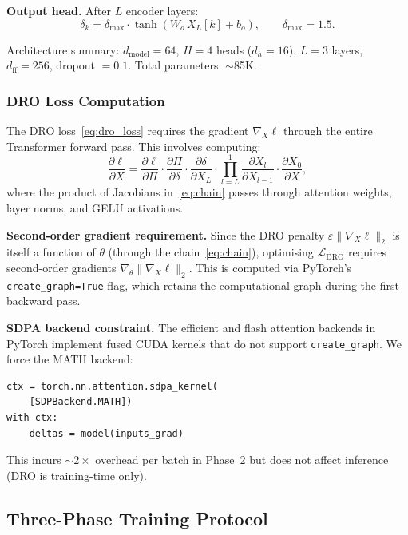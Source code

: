 \documentclass[11pt]{article}
\begin{document}
\textbf{Output head.}  After $L$ encoder layers:
\begin{equation}
    \delta_k = \delta_{\max} \cdot \tanh(W_o\, X_L[k] + b_o), \qquad \delta_{\max} = 1.5.
    \label{eq:output_head}
\end{equation}

Architecture summary: $d_{\mathrm{model}} = 64$, $H = 4$ heads ($d_h = 16$), $L = 3$ layers, $d_{\mathrm{ff}} = 256$, dropout $= 0.1$.  Total parameters: $\sim$85K.

\subsubsection{DRO Loss Computation}

The DRO loss~\eqref{eq:dro_loss} requires the gradient $\nabla_X \ell$ through the entire Transformer forward pass.  This involves computing:
\begin{equation}
    \frac{\partial \ell}{\partial X} = \frac{\partial \ell}{\partial \Pi} \cdot \frac{\partial \Pi}{\partial \delta} \cdot \frac{\partial \delta}{\partial X_L} \cdot \prod_{l=L}^{1} \frac{\partial X_l}{\partial X_{l-1}} \cdot \frac{\partial X_0}{\partial X},
    \label{eq:chain}
\end{equation}
where the product of Jacobians in~\eqref{eq:chain} passes through attention weights, layer norms, and GELU activations.

\textbf{Second-order gradient requirement.}  Since the DRO penalty $\varepsilon\|\nabla_X\ell\|_2$ is itself a function of $\theta$ (through the chain~\eqref{eq:chain}), optimising $\mathcal{L}_{\mathrm{DRO}}$ requires second-order gradients $\nabla_\theta\|\nabla_X\ell\|_2$.  This is computed via PyTorch's \texttt{create\_graph=True} flag, which retains the computational graph during the first backward pass.

\textbf{SDPA backend constraint.}  The efficient and flash attention backends in PyTorch implement fused CUDA kernels that do not support \texttt{create\_graph}.  We force the MATH backend:
\begin{verbatim}
ctx = torch.nn.attention.sdpa_kernel(
    [SDPBackend.MATH])
with ctx:
    deltas = model(inputs_grad)
\end{verbatim}
This incurs $\sim$$2\times$ overhead per batch in Phase~2 but does not affect inference (DRO is training-time only).

\subsection{Three-Phase Training Protocol}
\end{document}
